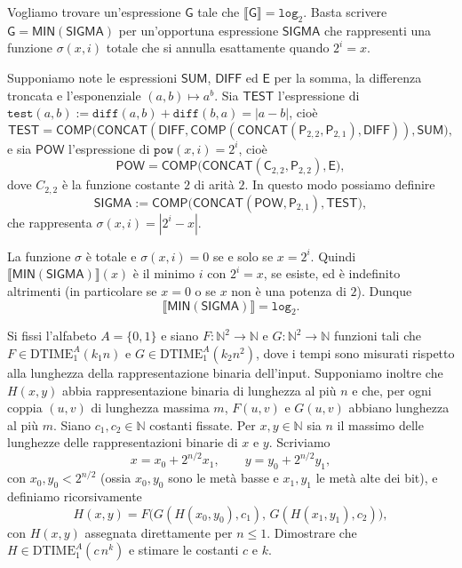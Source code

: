 \begin{sol}
    \item Vogliamo trovare un'espressione $\mathsf G$ tale che $\llbracket \mathsf G\rrbracket=\texttt{log}_2$. Basta scrivere $\mathsf G=\mathsf{MIN}(\mathsf{SIGMA})$ per un'opportuna espressione $\mathsf{SIGMA}$ che rappresenti una funzione $\sigma(x,i)$ totale che si annulla esattamente quando $2^{i}=x$.

    Supponiamo note le espressioni $\mathsf{SUM}$, $\mathsf{DIFF}$ ed $\mathsf E$ per la somma, la differenza troncata e l'esponenziale $(a,b)\mapsto a^{b}$. Sia $\mathsf{TEST}$ l'espressione di $\texttt{test}(a,b):=\texttt{diff}(a,b)+\texttt{diff}(b,a)=|a-b|$, cioè
    \[
    \mathsf{TEST}=\mathsf{COMP}\big(\mathsf{CONCAT}(\mathsf{DIFF},\mathsf{COMP}(\mathsf{CONCAT}(\mathsf P_{2,2},\mathsf P_{2,1}),\mathsf{DIFF})),\mathsf{SUM}\big),
    \]
    e sia $\mathsf{POW}$ l'espressione di $\texttt{pow}(x,i)=2^{i}$, cioè
    \[
    \mathsf{POW}=\mathsf{COMP}\big(\mathsf{CONCAT}(\mathsf C_{2,2},\mathsf P_{2,2}),\mathsf E\big),
    \]
    dove $C_{2,2}$ è la funzione costante $2$ di arità $2$. In questo modo possiamo definire
    \[
    \mathsf{SIGMA}:=\mathsf{COMP}\big(\mathsf{CONCAT}(\mathsf{POW},\mathsf P_{2,1}),\mathsf{TEST}\big),
    \]
    che rappresenta $\sigma(x,i)=|2^{i}-x|$.

    La funzione $\sigma$ è totale e $\sigma(x,i)=0$ se e solo se $x=2^{i}$. Quindi $\llbracket\mathsf{MIN}(\mathsf{SIGMA})\rrbracket(x)$ è il minimo $i$ con $2^{i}=x$, se esiste, ed è indefinito altrimenti (in particolare se $x=0$ o se $x$ non è una potenza di $2$). Dunque
    \[
    \llbracket\mathsf{MIN}(\mathsf{SIGMA})\rrbracket=\texttt{log}_2 .
    \]
\end{sol}

\newpage

\begin{ex}
Si fissi l'alfabeto $A=\{0,1\}$ e siano $F\colon\mathbb N^2\to\mathbb N$ e $G\colon\mathbb N^2\to\mathbb N$
funzioni tali che $F\in\mathrm{DTIME}^A_1(k_1 n)$ e $G\in\mathrm{DTIME}^A_1(k_2 n^2)$,
dove i tempi sono misurati rispetto alla lunghezza della rappresentazione binaria dell'input.
Supponiamo inoltre che $H(x,y)$ abbia rappresentazione binaria di lunghezza al più $n$
e che, per ogni coppia $(u,v)$ di lunghezza massima $m$, $F(u,v)$ e $G(u,v)$ abbiano lunghezza al più $m$.
Siano $c_1,c_2\in\mathbb N$ costanti fissate.
Per $x,y\in\mathbb N$ sia $n$ il massimo delle lunghezze delle rappresentazioni binarie di $x$ e $y$.
Scriviamo
\[
x=x_0+2^{n/2}x_1,\qquad y=y_0+2^{n/2}y_1,
\]
con $x_0,y_0<2^{n/2}$ (ossia $x_0,y_0$ sono le metà basse e $x_1,y_1$ le metà alte dei bit),
e definiamo ricorsivamente
\[
H(x,y)=F\big(G(H(x_0,y_0),c_1),\,G(H(x_1,y_1),c_2)\big),
\]
con $H(x,y)$ assegnata direttamente per $n\le 1$.
Dimostrare che $H\in\mathrm{DTIME}^A_1(c\,n^k)$ e stimare le costanti $c$ e $k$.
\end{ex}

